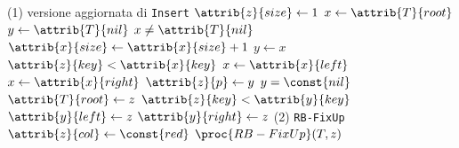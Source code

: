 \begin{codebox}
\zi \Comment (1) versione aggiornata di \texttt{Insert}
\li $\attrib{z}{size} \gets 1$
\li $x \gets \attrib{T}{root}$
\li $y \gets \attrib{T}{nil}$ 
\li \While $x \neq \attrib{T}{nil}$
\li \Do
        $\attrib{x}{size} \gets \attrib{x}{size} + 1$
\li     $y \gets x$
\li     \If $\attrib{z}{key} < \attrib{x}{key}$
\li     \Then
            $x \gets \attrib{x}{left}$
\li     \Else
\li         $x \gets \attrib{x}{right}$
        \End
    \End
\li $\attrib{z}{p} \gets y$
\li \If $y = \const{nil}$
\li \Then
        $\attrib{T}{root} \gets z$
\li \Else 
\li     \If $\attrib{z}{key} < \attrib{y}{key}$
\li     \Then
            $\attrib{y}{left} \gets z$
\li     \Else
\li         $\attrib{y}{right} \gets z$
        \End
    \End
\zi \Comment (2) \texttt{RB-FixUp}
\li $\attrib{z}{col} \gets \const{red}$
\li $\proc{RB-FixUp}(T,z)$
\end{codebox}